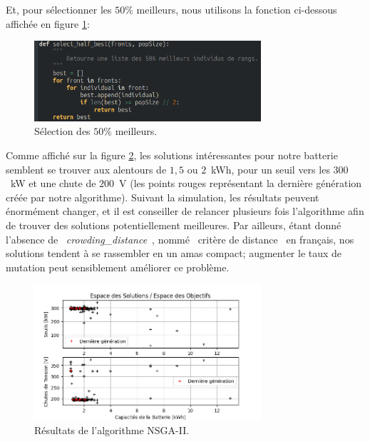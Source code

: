 \documentclass[11pt, a4paper, oneside, portrait]{report}
\begin{document}
        Et, pour sélectionner les $50\%{}$ meilleurs, nous utilisons la fonction ci-dessous affichée en figure \ref{fig:select_half_best}:

        \begin{figure}[H]
            \centering
            \includegraphics[width=0.75\textwidth]{Figures/select_half_best.png}
            \caption{Sélection des $50\%{}$ meilleurs.}
            \label{fig:select_half_best}
        \end{figure}

        Comme affiché sur la figure \ref{fig:NSGA2}, les solutions intéressantes pour notre batterie semblent se trouver aux alentours de $1,5$ ou $2$~kWh, pour un seuil vers les $300$~kW et une chute de $200$~V (les points rouges représentant la dernière génération créée par notre algorithme).
        Suivant la simulation, les résultats peuvent énormément changer, et il est conseiller de relancer plusieurs fois l'algorithme afin de trouver des solutions potentiellement meilleures.
        Par ailleurs, étant donné l'absence de \guillemotleft{}~\emph{crowding\_distance}~\guillemotright{}, nommé \guillemotleft{}~critère de distance~\guillemotright{} en français, nos solutions tendent à se rassembler en un amas compact; augmenter le taux de mutation peut sensiblement améliorer ce problème.

        \begin{figure}[H]
            \centering
            \includegraphics[width=0.75\textwidth]{Figures/NSGA-II.png}
            \caption{Résultats de l'algorithme NSGA-II.}
            \label{fig:NSGA2}
        \end{figure}
\end{document}
